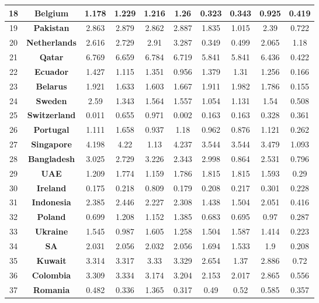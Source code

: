 \begin{table*}
\begin{center}
\begin{tiny}
\begin{tabular}{|c|c|c|c|c|c|c|c|c|c|}
18 & {\bf Belgium} & 1.178 & 1.229 & 1.216 & 1.26 & 0.323 & 0.343 & 0.925 & 0.419\\ \hline
19 & {\bf Pakistan} & 2.863 & 2.879 & 2.862 & 2.887 & 1.835 & 1.015 & 2.39 & 0.722\\ \hline
20 & {\bf Netherlands} & 2.616 & 2.729 & 2.91 & 3.287 & 0.349 & 0.499 & 2.065 & 1.18\\ \hline
21 & {\bf Qatar} & 6.769 & 6.659 & 6.784 & 6.719 & 5.841 & 5.841 & 6.436 & 0.422\\ \hline
22 & {\bf Ecuador} & 1.427 & 1.115 & 1.351 & 0.956 & 1.379 & 1.31 & 1.256 & 0.166\\ \hline
23 & {\bf Belarus} & 1.921 & 1.633 & 1.603 & 1.667 & 1.911 & 1.982 & 1.786 & 0.155\\ \hline
24 & {\bf Sweden} & 2.59 & 1.343 & 1.564 & 1.557 & 1.054 & 1.131 & 1.54 & 0.508\\ \hline
25 & {\bf Switzerland} & 0.011 & 0.655 & 0.971 & 0.002 & 0.163 & 0.163 & 0.328 & 0.361\\ \hline
26 & {\bf Portugal} & 1.111 & 1.658 & 0.937 & 1.18 & 0.962 & 0.876 & 1.121 & 0.262\\ \hline
27 & {\bf Singapore} & 4.198 & 4.22 & 1.13 & 4.237 & 3.544 & 3.544 & 3.479 & 1.093\\ \hline
28 & {\bf Bangladesh} & 3.025 & 2.729 & 3.226 & 2.343 & 2.998 & 0.864 & 2.531 & 0.796\\ \hline
29 & {\bf UAE} & 1.209 & 1.774 & 1.159 & 1.786 & 1.815 & 1.815 & 1.593 & 0.29\\ \hline
30 & {\bf Ireland} & 0.175 & 0.218 & 0.809 & 0.179 & 0.208 & 0.217 & 0.301 & 0.228\\ \hline
31 & {\bf Indonesia} & 2.385 & 2.446 & 2.227 & 2.308 & 1.438 & 1.504 & 2.051 & 0.416\\ \hline
32 & {\bf Poland} & 0.699 & 1.208 & 1.152 & 1.385 & 0.683 & 0.695 & 0.97 & 0.287\\ \hline
33 & {\bf Ukraine} & 1.545 & 0.987 & 1.605 & 1.258 & 1.504 & 1.587 & 1.414 & 0.223\\ \hline
34 & {\bf SA} & 2.031 & 2.056 & 2.032 & 2.056 & 1.694 & 1.533 & 1.9 & 0.208\\ \hline
35 & {\bf Kuwait} & 3.314 & 3.317 & 3.33 & 3.329 & 2.654 & 1.37 & 2.886 & 0.72\\ \hline
36 & {\bf Colombia} & 3.309 & 3.334 & 3.174 & 3.204 & 2.153 & 2.017 & 2.865 & 0.556\\ \hline
37 & {\bf Romania} & 0.482 & 0.336 & 1.365 & 0.317 & 0.49 & 0.52 & 0.585 & 0.357\\ \hline

\end{tabular}
\end{tiny}
\end{center}
\end{table*}

